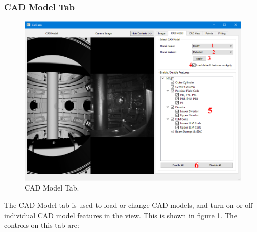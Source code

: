 \documentclass[12pt]{article}
\begin{document}
\subsubsection{CAD Model Tab}

\begin{figure}[htb]
\includegraphics[width=\textwidth]{cad_model_tab.PNG}
\caption{\label{fig:cad_tab}CAD Model Tab.}
\end{figure}

The CAD Model tab is used to load or change CAD models, and turn on or off individual CAD model features in the view. This is shown in figure \ref{fig:cad_tab}. The controls on this tab are:
\end{document}
